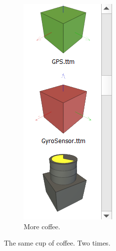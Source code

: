 \begin{figure}[h!]
\begin{subfigure}[b]{0.4\linewidth}
    \includegraphics[width=\linewidth]{figures/selecting_gyro_acc_componant.png}
    \caption{More coffee.}
  \end{subfigure}
  \caption{The same cup of coffee. Two times.}
  \label{fig:coffee}
\end{figure}

